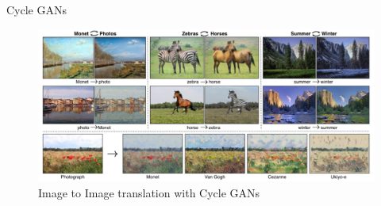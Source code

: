 \begin{frame}[allowframebreaks]{Cycle GANs}
\framebreak
\begin{figure}
    \centering
    \includegraphics[height=0.9\textheight, width=\textwidth, keepaspectratio]{images/gan/cycle_gan_6.png}
    \caption*{Image to Image translation with Cycle GANs}
\end{figure}
\end{frame}
